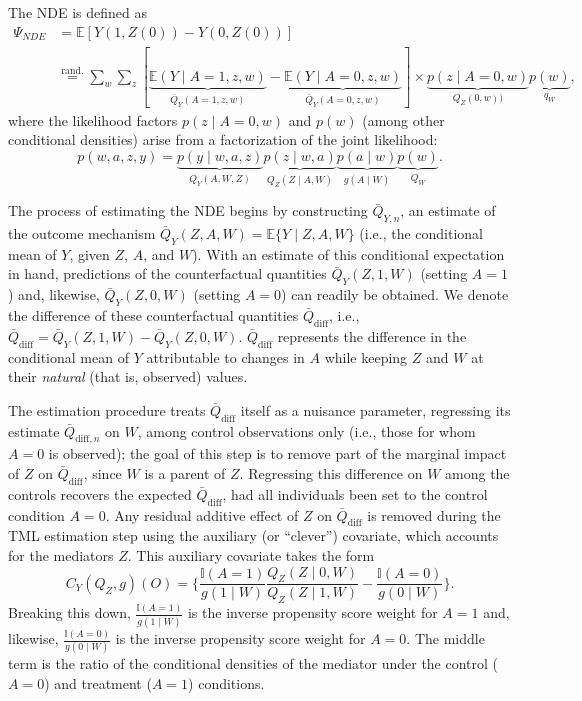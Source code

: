 \documentclass[12pt, krantz2,]{krantz}
\theoremstyle{definition}
\theoremstyle{definition}
\theoremstyle{definition}
\newcommand{\E}{\mathbb{E}}
\newcommand{\1}{\mathbbm{1}}
\begin{document}
The NDE is defined as
\begin{align*}
  \Psi_{NDE} &= \E[Y(1, Z(0)) - Y(0, Z(0))] \\
  &\overset{\text{rand.}}{=} \sum_w \sum_z
  [\underbrace{\E(Y \mid A = 1, z, w)}_{\bar{Q}_Y(A = 1, z, w)} -
  \underbrace{\E(Y \mid A = 0, z, w)}_{\bar{Q}_Y(A = 0, z, w)}] \times
  \underbrace{p(z \mid A = 0, w)}_{Q_Z(0, w))} \underbrace{p(w)}_{q_W},
\end{align*}
where the likelihood factors \(p(z \mid A = 0, w)\) and \(p(w)\) (among other
conditional densities) arise from a factorization of the joint likelihood:
\begin{equation*}
  p(w, a, z, y) = \underbrace{p(y \mid w, a, z)}_{Q_Y(A, W, Z)}
  \underbrace{p(z \mid w, a)}_{Q_Z(Z \mid A, W)}
  \underbrace{p(a \mid w)}_{g(A \mid W)}
  \underbrace{p(w)}_{Q_W}.
\end{equation*}

The process of estimating the NDE begins by constructing \(\bar{Q}_{Y, n}\), an
estimate of the outcome mechanism \(\bar{Q}_Y(Z, A, W) = \E \{Y \mid Z, A, W\}\) (i.e., the conditional mean of \(Y\), given \(Z\), \(A\), and \(W\)). With an
estimate of this conditional expectation in hand, predictions of the
counterfactual quantities \(\bar{Q}_Y(Z, 1, W)\) (setting \(A = 1\)) and, likewise,
\(\bar{Q}_Y(Z, 0, W)\) (setting \(A = 0\)) can readily be obtained. We denote the
difference of these counterfactual quantities \(\bar{Q}_{\text{diff}}\), i.e.,
\(\bar{Q}_{\text{diff}} = \bar{Q}_Y(Z, 1, W) - \bar{Q}_Y(Z, 0, W)\).
\(\bar{Q}_{\text{diff}}\) represents the difference in the conditional mean of
\(Y\) attributable to changes in \(A\) while keeping \(Z\) and \(W\) at their \emph{natural}
(that is, observed) values.

The estimation procedure treats \(\bar{Q}_{\text{diff}}\) itself as a nuisance
parameter, regressing its estimate \(\bar{Q}_{\text{diff}, n}\) on \(W\), among
control observations only (i.e., those for whom \(A = 0\) is observed); the goal
of this step is to remove part of the marginal impact of \(Z\) on
\(\bar{Q}_{\text{diff}}\), since \(W\) is a parent of \(Z\). Regressing this
difference on \(W\) among the controls recovers the expected
\(\bar{Q}_{\text{diff}}\), had all individuals been set to the control condition
\(A = 0\). Any residual additive effect of \(Z\) on \(\bar{Q}_{\text{diff}}\) is
removed during the TML estimation step using the auxiliary (or ``clever'')
covariate, which accounts for the mediators \(Z\). This auxiliary covariate takes
the form
\begin{equation*}
  C_Y(Q_Z, g)(O) = \Bigg\{\frac{\mathbb{I}(A = 1)}{g(1 \mid W)}
  \frac{Q_Z(Z \mid 0, W)}{Q_Z(Z \mid 1, W)} -
  \frac{\mathbb{I}(A = 0)}{g(0 \mid W)} \Bigg\}.
\end{equation*}
Breaking this down, \(\frac{\mathbb{I}(A = 1)}{g(1 \mid W)}\) is the inverse
propensity score weight for \(A = 1\) and, likewise, \(\frac{\mathbb{I}(A = 0)} {g(0 \mid W)}\) is the inverse propensity score weight for \(A = 0\). The middle
term is the ratio of the conditional densities of the mediator under the control
(\(A = 0\)) and treatment (\(A = 1\)) conditions.
\end{document}
